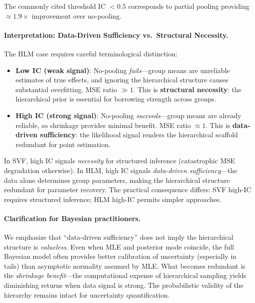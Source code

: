 \documentclass[10pt]{article} %
\theoremstyle{plain}
\theoremstyle{definition}
\begin{document}
\noindent The commonly cited threshold IC $< 0.5$ corresponds to partial pooling providing $\approx 1.9\times$ improvement over no-pooling.

\paragraph{Interpretation: Data-Driven Sufficiency vs.\ Structural Necessity.} The HLM case requires careful terminological distinction:

\begin{itemize}
    \item \textbf{Low IC (weak signal)}: No-pooling \emph{fails}---group means are unreliable estimates of true effects, and ignoring the hierarchical structure causes substantial overfitting. MSE ratio $\gg 1$. This is \textbf{structural necessity}: the hierarchical prior is essential for borrowing strength across groups.
    
    \item \textbf{High IC (strong signal)}: No-pooling \emph{succeeds}---group means are already reliable, so shrinkage provides minimal benefit. MSE ratio $\approx 1$. This is \textbf{data-driven sufficiency}: the likelihood signal renders the hierarchical scaffold redundant for point estimation.
\end{itemize}

\noindent In SVF, high IC signals \emph{necessity} for structured inference (catastrophic MSE degradation otherwise). In HLM, high IC signals \emph{data-driven sufficiency}---the data alone determines group parameters, making the hierarchical structure redundant for parameter recovery. The practical consequence differs: SVF high-IC requires structured inference; HLM high-IC permits simpler approaches.

\paragraph{Clarification for Bayesian practitioners.} We emphasize that ``data-driven sufficiency'' does not imply the hierarchical structure is \emph{valueless}. Even when MLE and posterior mode coincide, the full Bayesian model often provides better calibration of uncertainty (especially in tails) than asymptotic normality assumed by MLE. What becomes redundant is the \emph{shrinkage benefit}---the computational expense of hierarchical sampling yields diminishing returns when data signal is strong. The probabilistic validity of the hierarchy remains intact for uncertainty quantification.
\end{document}
